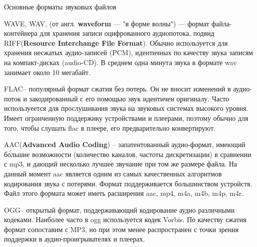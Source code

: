 \documentclass[aspectratio=169]{beamer}
\newcommand{\zag}{\huge\alert}
\newcommand{\n}{\normalsize}
\begin{document}
\begin{frame}[shrink=31]{Основные форматы звуковых файлов}


    \zag{WAVE},  \zag{WAV}\n, (от англ. \textbf{waveform} — "в форме волны") — формат файла-контейнера для хранения записи оцифрованного аудиопотока, подвид \alert{RIFF}(\textbf{Resource Interchange File Format}). Обычно используется для хранения несжатых аудио-записей (\alert{PCM}), идентичных по качеству звука записям на компакт-дисках (\alert{audio-CD}). В среднем одна минута звука в формате wav занимает около 10 мегабайт.

 \vspace{10pt}
 
 \zag{FLAC}\n – популярный формат сжатия без потерь. Он не вносит изменений в аудио-поток и закодированный с его помощью звук идентичен оригиналу. Часто используеется для прослушивания звука на звуковых системах высокого уровня. Имеет огранченную поддержику устройствами и плеерами, поэтому обычно для того, чтобы слушать \alert{flac} в плеере, его предварительно конвертируют.
 
 \vspace{10pt}
 
 \zag{AAC}\n (\textbf{Advanced Audio Coding})  – запатентованный аудио-формат, имеющий б\'{о}льшие возможности (количество каналов, частоты дискретизации)  в сравнении с mp3, и дающий несколько лучшее звучание при том же размере файла. На данный момент \alert{aac} является одним из самых качественных алгоритмов кодирования звука с потерями. Формат поддерживается большинством устройств. Файл этого формата может иметь расширения \alert{aac, mp4, m4a, m4b, m4p, m4r}.
 
  \vspace{10pt}
 
 \zag{OGG}\n – открытый формат, поддерживающий кодирование аудио различными кодеками. Наиболее часто в \alert{ogg} используется кодек \alert{Vorbis}. По качеству сжатия формат сопоставим с \alert{MP3}, но при этом менее распространен с точки зрения поддержки в аудио-проигрывателях и плеерах.
 
 \end{frame}
\end{document}
